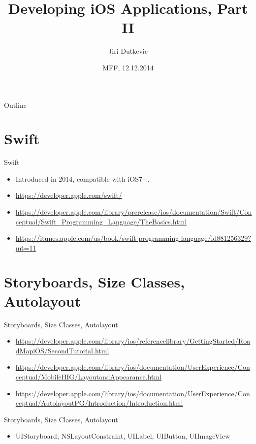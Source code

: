\documentclass{beamer}
\title{Developing iOS Applications, Part II}
\author{Jiri Dutkevic}
\institute[Avast]
{
    jd@avast.com\\
    Avast Mobile
}
\date{MFF, 12.12.2014}
\begin{document}
\begin{frame}
  \titlepage
\end{frame}

\begin{frame}{Outline}
  \tableofcontents
\end{frame}

\section{Swift}

\begin{frame}{Swift}
    \begin{itemize}
      \item {
        Introduced in 2014, compatible with iOS7+.
      }
      \item {
        \url{https://developer.apple.com/swift/}
      }
      \item {
        \url{https://developer.apple.com/library/prerelease/ios/documentation/Swift/Conceptual/Swift_Programming_Language/TheBasics.html}
      }
      \item {
        \url{https://itunes.apple.com/us/book/swift-programming-language/id881256329?mt=11}
      }
    \end{itemize}
\end{frame}

\section{Storyboards, Size Classes, Autolayout}

\begin{frame}{Storyboards, Size Classes, Autolayout}
    \begin{itemize}
    \item {
        \url {https://developer.apple.com/library/ios/referencelibrary/GettingStarted/RoadMapiOS/SecondTutorial.html}
    }
    \item {
        \url{https://developer.apple.com/library/ios/documentation/UserExperience/Conceptual/MobileHIG/LayoutandAppearance.html}
    }
    \item {
        \url {https://developer.apple.com/library/ios/documentation/UserExperience/Conceptual/AutolayoutPG/Introduction/Introduction.html}
    }
    \end{itemize}
\end{frame}

\begin{frame}{Storyboards, Size Classes, Autolayout}
    \begin{itemize}
    \item {
        UIStoryboard, NSLayoutConstraint, UILabel, UIButton, UIImageView
    }
    \end{itemize}
\end{frame}
\end{document}
